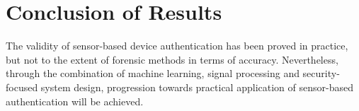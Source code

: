 \section{Conclusion of Results}

The validity of sensor-based device authentication has been proved in practice, but not to the extent of forensic methods in terms of accuracy. Nevertheless, through the combination of machine learning, signal processing and security-focused system design, progression towards practical application of sensor-based authentication will be achieved.
